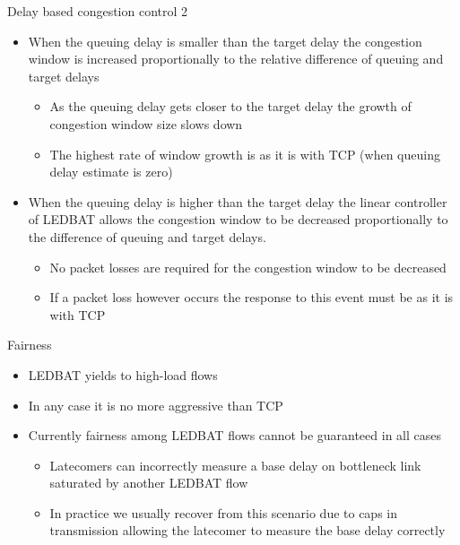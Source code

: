 \documentclass{beamer}
\begin{document}
\begin{frame}{Delay based congestion control 2}
    \begin{itemize}
        \item When the queuing delay is smaller than the target delay the
        congestion window is increased proportionally to the relative difference
        of queuing and target delays
        \begin{itemize}
            \item As the queuing delay gets closer to the target delay the
            growth of congestion window size slows down
            \item The highest rate of window growth is as it is with TCP (when
            queuing delay estimate is zero)
        \end{itemize}

        \item When the queuing delay is higher than the target delay the linear
        controller of LEDBAT allows the congestion window to be decreased
        proportionally to the difference of queuing and target delays.
        \begin{itemize}
            \item No packet losses are required for the congestion window to be
            decreased
            \item If a packet loss however occurs the response to this event
            must be as it is with TCP
        \end{itemize}
    \end{itemize}
\end{frame}

\begin{frame}{Fairness}
    \begin{itemize}
        \item LEDBAT yields to high-load flows
        \item In any case it is no more aggressive than TCP
        \item Currently fairness among LEDBAT flows cannot be guaranteed in all cases
            \begin{itemize}
                \item Latecomers can incorrectly measure a base delay on
                bottleneck link saturated by another LEDBAT flow
                \item In practice we usually recover from this scenario due to
                caps in transmission allowing the latecomer to measure the base
                delay correctly
            \end{itemize}
    \end{itemize}
\end{frame}
\end{document}
